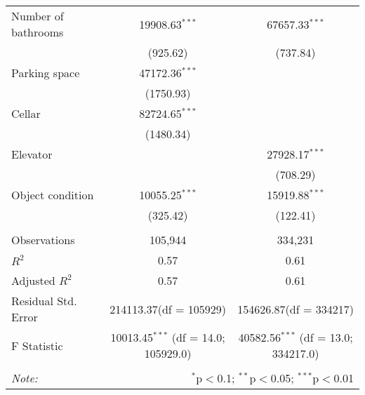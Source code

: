 \begin{table}[!htbp]
\begin{tabular}{@{\extracolsep{5pt}}lcc}
 Number of bathrooms & 19908.63$^{***}$ & 67657.33$^{***}$ \\
  & (925.62) & (737.84) \\
 Parking space & 47172.36$^{***}$ & \\
  & (1750.93) & \\
 Cellar & 82724.65$^{***}$ & \\
  & (1480.34) & \\
 Elevator & & 27928.17$^{***}$ \\
  & & (708.29) \\
 Object condition & 10055.25$^{***}$ & 15919.88$^{***}$ \\
  & (325.42) & (122.41) \\
\hline \\[-1.8ex]
 Observations & 105,944 & 334,231 \\
 $R^2$ & 0.57 & 0.61 \\
 Adjusted $R^2$ & 0.57 & 0.61 \\
 Residual Std. Error & 214113.37(df = 105929) & 154626.87(df = 334217)  \\
 F Statistic & 10013.45$^{***}$ (df = 14.0; 105929.0) & 40582.56$^{***}$ (df = 13.0; 334217.0) \\
\hline
\hline \\[-1.8ex]
\textit{Note:} & \multicolumn{2}{r}{$^{*}$p$<$0.1; $^{**}$p$<$0.05; $^{***}$p$<$0.01} \\
\end{tabular}
\end{table}